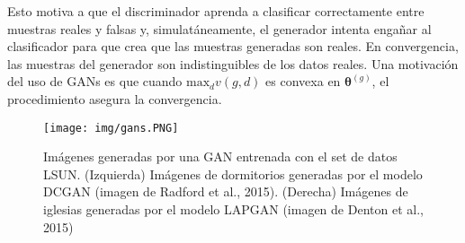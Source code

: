 Esto motiva a que el discriminador aprenda a clasificar correctamente entre muestras reales y falsas y, simulat\'aneamente, el generador intenta enga{\~{n}}ar al clasificador para que crea que las muestras generadas son reales. En convergencia, las muestras del generador son indistinguibles de los datos reales. Una motivaci\'on del uso de GANs es que cuando $\textrm{max}_{d} v(g,d)$ es convexa en $\bm{\theta}^{(g)}$, el procedimiento asegura la convergencia.

\begin{figure}[H]
\captionsetup{font=small,labelfont=small}
\caption{Im\'agenes generadas por una GAN entrenada con el set de datos LSUN. (Izquierda) Im\'agenes de dormitorios generadas por el modelo DCGAN (imagen de Radford et al., 2015). (Derecha) Im\'agenes de iglesias generadas por el modelo LAPGAN (imagen de Denton et al., 2015)}
\centering
\texttt{[image: img/gans.PNG]}
\end{figure}
